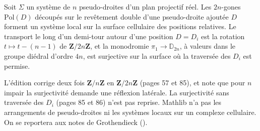 \begin{encadre}
\begin{theoreme*}\nonverifie
Soit $\Sigma$ un système de $n$ pseudo-droites d'un plan projectif réel. Les $2n$-gones $\mathrm{Pol}(D)$ découpés sur le revêtement double d'une pseudo-droite ajoutée $D$ forment un système local sur la surface cellulaire des positions relatives. Le transport le long d'un demi-tour autour d'une position $D = D_i$ est la rotation $t \mapsto t - (n-1)$ de $\mathbf Z/2n\mathbf Z$, et la monodromie $\pi_1 \to \mathbb D_{2n}$, à valeurs dans le groupe diédral d'ordre $4n$, est surjective sur la surface où la traversée des $D_i$ est permise.
\end{theoreme*}
\end{encadre}
{\small L'édition corrige deux fois $\mathbf Z/n\mathbf Z$ en $\mathbf Z/2n\mathbf Z$ (pages 57 et 85), et note que pour $n$ impair la surjectivité demande une réflexion latérale. La surjectivité sans traversée des $D_i$ (pages 85 et 86) n'est pas reprise. Mathlib n'a pas les arrangements de pseudo-droites ni les systèmes locaux sur un complexe cellulaire. On se reportera aux notes de Grothendieck ().\par}

